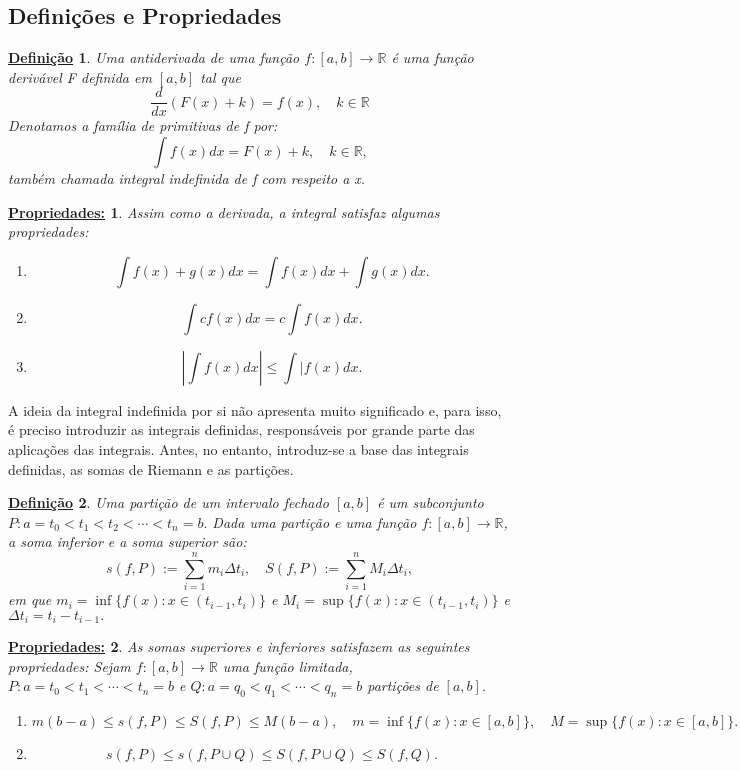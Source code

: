\documentclass{article}
\newtheorem*{def*}{\underline{Defini\c c\~ao}}
\newtheorem*{prop*}{\underline{Propriedades:}}
\begin{document}
    \subsection{Defini\c c\~oes e Propriedades}
    \begin{def*}
        Uma antiderivada de uma fun\c c\~ao $f:[a, b]\rightarrow\mathbb{R}$ \'e uma fun\c c\~ao deriv\'avel F definida em $[a, b]$ tal que
        $$  
            \frac{d}{dx}(F(x) + k) = f(x), \quad k\in\mathbb{R}
        $$
        Denotamos a fam\'ilia de primitivas de f por:
        $$
            \int f(x)dx = F(x) + k, \quad k\in\mathbb{R},
        $$
        tamb\'em chamada integral indefinida de f com respeito a x.
    \end{def*}
    \begin{prop*}    
        Assim como a derivada, a integral satisfaz algumas propriedades:
        \begin{enumerate}
            \item[Propriedade I)] $$\int f(x) + g(x)dx = \int f(x)dx + \int g(x)dx.$$
            \item[Propriedade II)] $$\int cf(x)dx = c\int f(x)dx.$$
            \item[Propriedade IV)] $$|\int f(x)dx| \leq \int |f(x)dx.$$
        \end{enumerate}
    \end{prop*}
    A ideia da integral indefinida por si n\~ao apresenta muito significado e, para isso, \'e preciso introduzir as integrais definidas, respons\'aveis por grande
    parte das aplica\c c\~oes das integrais. Antes, no entanto, introduz-se a base das integrais definidas, as somas de Riemann e as parti\c c\~oes.
    \begin{def*}
        Uma parti\c c\~ao de um intervalo fechado $[a, b]$ \'e um subconjunto $P: a = t_0 < t_1 < t_2 < \cdots < t_n = b.$ Dada uma parti\c c\~ao e uma fun\c c\~ao 
        $f:[a, b]\rightarrow\mathbb{R}$, a soma inferior e a soma superior s\~ao:
        $$
            s(f, P):=\sum_{i=1}^{n}m_i\Delta{t_i}, \quad S(f, P):= \sum_{i=1}^{n}M_i\Delta{t_i},
        $$
        em que $m_i = \inf\{f(x): x\in(t_{i-1}, t_{i})\}$ e $M_i = \sup\{f(x): x\in(t_{i-1}, t_{i})\}$ e $\Delta{t_i} = t_i - t_{i-1}.$
    \end{def*}
    \begin{prop*}
        As somas superiores e inferiores satisfazem as seguintes propriedades: Sejam $f:[a, b]\rightarrow\mathbb{R}$ uma fun\c c\~ao limitada, 
        $P: a = t_0 < t_1 < \cdots < t_n = b$ e $Q: a = q_0 < q_1 < \cdots < q_n = b$ parti\c c\~oes de $[a, b].$
        \begin{enumerate}
            \item[Propriedade I)] $$m(b-a)\leq{s(f, P)}\leq{S(f, P)}\leq{M(b-a)}, \quad m=\inf\{f(x): x\in[a, b]\}, \quad M=\sup\{f(x): x\in[a, b]\}.$$
            \item[Propriedade II)] $$s(f, P) \leq s(f, P\cup{Q}) \leq S(f, P\cup{Q}) \leq S(f, Q).$$ 
        \end{enumerate}
    \end{prop*}
\end{document}
